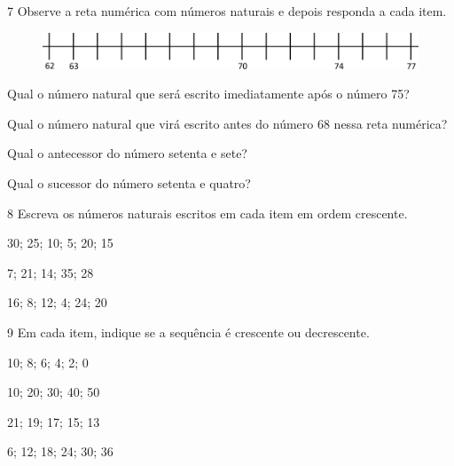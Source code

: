 \num{7} Observe a reta numérica com números naturais e depois responda a cada item.

\begin{figure}[htpb!]
\includegraphics[width=\textwidth]{./media/image31.png}
\end{figure}

\begin{escolha}
\item Qual o número natural que será escrito imediatamente após o número 75?


\item Qual o número natural que virá escrito antes do número 68 nessa reta numérica?


\item Qual o antecessor do número setenta e sete?

\reduline{76\hfill}

\item Qual o sucessor do número setenta e quatro?

\reduline{75\hfill}
\end{escolha}

\num{8} Escreva os números naturais escritos em cada item em ordem crescente.

\begin{escolha}
\item 30; 25; 10; 5; 20; 15


\item 7; 21; 14; 35; 28


\item 16; 8; 12; 4; 24; 20

\end{escolha}

\num{9} Em cada item, indique se a sequência é crescente ou decrescente.

\begin{escolha}
\item 10; 8; 6; 4; 2; 0


\item 10; 20; 30; 40; 50


\item 21; 19; 17; 15; 13


\item 6; 12; 18; 24; 30; 36

\end{escolha}

